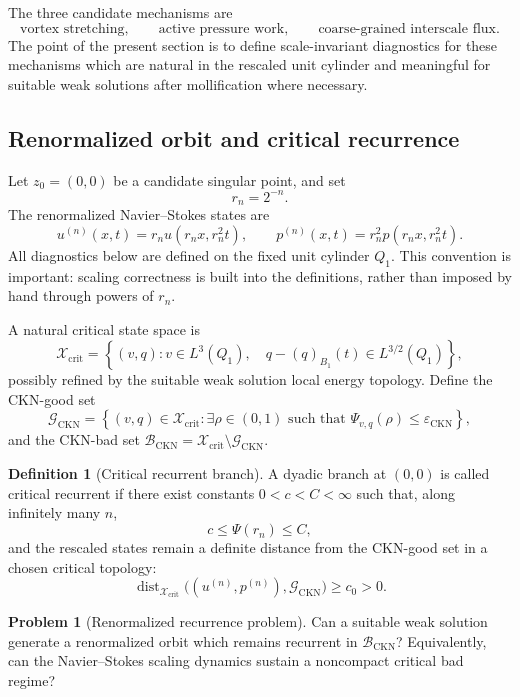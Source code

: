 \documentclass[11pt]{article}
\numberwithin{equation}{section}
\theoremstyle{plain}
\theoremstyle{definition}
\newtheorem{definition}[theorem]{Definition}
\newtheorem{problem}[theorem]{Problem}
\theoremstyle{remark}
\newcommand{\eps}{\varepsilon}
\newcommand{\CKN}{\mathrm{CKN}}
\newcommand{\dist}{\operatorname{dist}}
\newcommand{\Xcrit}{\mathcal X_{\mathrm{crit}}}
\newcommand{\Good}{\mathcal G}
\newcommand{\Bad}{\mathcal B}
\begin{document}
The three candidate mechanisms are
\[
    \text{vortex stretching},
    \qquad
    \text{active pressure work},
    \qquad
    \text{coarse-grained interscale flux}.
\]
The point of the present section is to define scale-invariant diagnostics for these mechanisms which are natural in the rescaled unit cylinder and meaningful for suitable weak solutions after mollification where necessary.

\subsection{Renormalized orbit and critical recurrence}

Let \(z_0=(0,0)\) be a candidate singular point, and set
\[
    r_n=2^{-n}.
\]
The renormalized Navier--Stokes states are
\begin{equation}
    u^{(n)}(x,t)=r_nu(r_nx,r_n^2t),
    \qquad
    p^{(n)}(x,t)=r_n^2p(r_nx,r_n^2t).
\end{equation}
All diagnostics below are defined on the fixed unit cylinder \(Q_1\).  This convention is important: scaling correctness is built into the definitions, rather than imposed by hand through powers of \(r_n\).

A natural critical state space is
\[
    \Xcrit
    =
    \left\{
    (v,q):
    v\in L^3(Q_1),\quad
    q-(q)_{B_1}(t)\in L^{3/2}(Q_1)
    \right\},
\]
possibly refined by the suitable weak solution local energy topology.  Define the CKN-good set
\[
    \Good_{\CKN}
    =
    \left\{
    (v,q)\in\Xcrit:
    \exists\rho\in(0,1)
    \text{ such that }
    \Psi_{v,q}(\rho)\le\eps_{\CKN}
    \right\},
\]
and the CKN-bad set \(\Bad_{\CKN}=\Xcrit\setminus\Good_{\CKN}\).

\begin{definition}[Critical recurrent branch]
A dyadic branch at \((0,0)\) is called critical recurrent if there exist constants \(0<c<C<\infty\) such that, along infinitely many \(n\),
\[
    c\le \Psi(r_n)\le C,
\]
and the rescaled states remain a definite distance from the CKN-good set in a chosen critical topology:
\[
    \dist_{\Xcrit}
    \bigl((u^{(n)},p^{(n)}),\Good_{\CKN}\bigr)
    \ge c_0>0.
\]
\end{definition}

\begin{problem}[Renormalized recurrence problem]
Can a suitable weak solution generate a renormalized orbit which remains recurrent in \(\Bad_{\CKN}\)?  Equivalently, can the Navier--Stokes scaling dynamics sustain a noncompact critical bad regime?
\end{problem}
\end{document}
